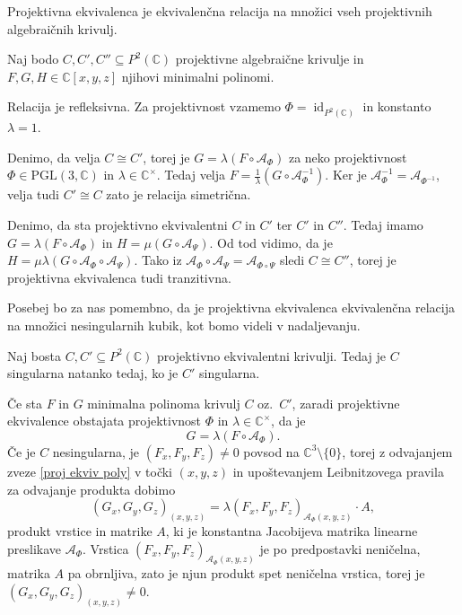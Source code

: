 \documentclass[mat1]{fmfdelo}
\newcommand{\C}{\mathbb C}
\newcommand{\CM}{\mathbb C ^\times}
\newcommand{\PC}{P^2(\mathbb C)}
\newcommand{\Cxyz}{\C[x,y,z]}
\newcommand{\inv}{^{-1}}
\DeclareMathOperator{\id}{id}
\theoremstyle{definition}
\begin{document}
\begin{trditev}
    Projektivna ekvivalenca je ekvivalenčna relacija na množici vseh projektivnih algebraičnih krivulj.
\end{trditev}

\begin{dokaz}
    Naj bodo $C, C', C'' \subseteq \PC$ projektivne algebraične krivulje in $F, G, H \in \Cxyz$ njihovi minimalni polinomi. 
    \par Relacija je refleksivna. Za projektivnost vzamemo $\Phi = \id_{\PC}$ in konstanto $\lambda = 1$. 
    \par Denimo, da velja $C \cong C'$, torej je $G = \lambda (F \circ \mathcal{A}_\Phi)$ za neko projektivnost $\Phi \in \operatorname{PGL(3, \C)}$ in $\lambda \in \CM$. Tedaj velja $F = \frac{1}{\lambda} (G \circ \mathcal{A}_\Phi\inv)$. Ker je $\mathcal{A}_\Phi\inv = \mathcal{A}_{\Phi\inv}$, velja tudi $C' \cong C$ zato je relacija simetrična. 
    \par Denimo, da sta projektivno ekvivalentni $C$ in $C'$ ter $C'$ in $C''$. Tedaj imamo $G = \lambda (F \circ \mathcal{A}_\Phi)$ in $H = \mu (G \circ \mathcal{A}_\Psi)$. Od tod vidimo, da je $H = \mu\lambda(G \circ \mathcal{A}_\Phi \circ \mathcal{A}_\Psi)$. Tako iz $\mathcal{A}_\Phi \circ \mathcal{A}_\Psi = \mathcal{A}_{\Phi \circ \Psi}$ sledi $C \cong C''$, torej je projektivna ekvivalenca tudi tranzitivna. 
\end{dokaz}

Posebej bo za nas pomembno, da je projektivna ekvivalenca ekvivalenčna relacija na množici nesingularnih kubik, kot bomo videli v nadaljevanju. 

\begin{trditev}
    Naj bosta $C, C' \subseteq \PC$ projektivno ekvivalentni krivulji. Tedaj je $C$ singularna natanko tedaj, ko je $C'$ singularna. 
\end{trditev}

\begin{dokaz}
    Če sta $F$ in $G$ minimalna polinoma krivulj $C$ oz.\ $C'$, zaradi projektivne ekvivalence obstajata projektivnost $\Phi$ in $\lambda \in \CM$, da je
    \begin{equation}
        \label{proj ekviv poly}
        G = \lambda (F \circ \mathcal{A}_\Phi).
    \end{equation}
    Če je $C$ nesingularna, je $(F_x, F_y, F_z) \neq 0$ povsod na $\C^3\setminus\{0\}$, torej z odvajanjem zveze \ref{proj ekviv poly} v točki $(x,y,z)$ in upoštevanjem Leibnitzovega pravila za odvajanje produkta dobimo
    \[
        (G_x, G_y, G_z)_{(x,y,z)} = \lambda (F_x, F_y, F_z)_{\mathcal{A}_\Phi (x,y,z)} \cdot A,
    \]
    produkt vrstice in matrike $A$, ki je konstantna Jacobijeva matrika linearne preslikave $\mathcal{A}_\Phi$. Vrstica $(F_x, F_y, F_z)_{\mathcal{A}_\Phi (x,y,z)}$ je po predpostavki neničelna, matrika $A$ pa obrnljiva, zato je njun produkt spet neničelna vrstica, torej je $(G_x, G_y, G_z)_{(x,y,z)} \neq 0$. 
\end{dokaz}
\end{document}
